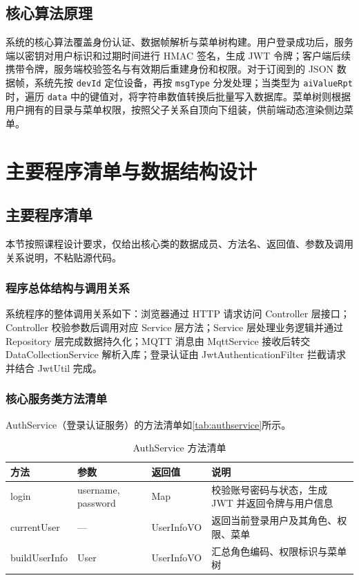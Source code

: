 \documentclass[12pt,hyperref,a4paper,UTF8]{ctexart}
\begin{document}
\subsection{核心算法原理}

系统的核心算法覆盖身份认证、数据帧解析与菜单树构建。用户登录成功后，服务端以密钥对用户标识和过期时间进行 HMAC 签名，生成 JWT 令牌；客户端后续携带令牌，服务端校验签名与有效期后重建身份和权限。对于订阅到的 JSON 数据帧，系统先按 \texttt{devId} 定位设备，再按 \texttt{msgType} 分发处理；当类型为 \texttt{aiValueRpt} 时，遍历 \texttt{data} 中的键值对，将字符串数值转换后批量写入数据库。菜单树则根据用户拥有的目录与菜单权限，按照父子关系自顶向下组装，供前端动态渲染侧边菜单。

\section{主要程序清单与数据结构设计}

\subsection{主要程序清单}

本节按照课程设计要求，仅给出核心类的数据成员、方法名、返回值、参数及调用关系说明，不粘贴源代码。

\subsubsection{程序总体结构与调用关系}

系统程序的整体调用关系如下：浏览器通过 HTTP 请求访问 Controller 层接口；Controller 校验参数后调用对应 Service 层方法；Service 层处理业务逻辑并通过 Repository 层完成数据持久化；MQTT 消息由 MqttService 接收后转交 DataCollectionService 解析入库；登录认证由 JwtAuthenticationFilter 拦截请求并结合 JwtUtil 完成。

\subsubsection{核心服务类方法清单}

AuthService（登录认证服务）的方法清单如\autoref{tab:authservice}所示。

\begin{table}[!htbp]
    \centering
    \caption{AuthService 方法清单}
    \label{tab:authservice}
    \begin{tabularx}{0.90\textwidth}{@{}L{3.2cm} L{3.4cm} L{2.3cm} Y@{}}
    \toprule
    \textbf{方法} & \textbf{参数} & \textbf{返回值} & \textbf{说明} \\
    \midrule
    login & username, password & Map & 校验账号密码与状态，生成 JWT 并返回令牌与用户信息 \\
    currentUser & — & UserInfoVO & 返回当前登录用户及其角色、权限、菜单 \\
    buildUserInfo & User & UserInfoVO & 汇总角色编码、权限标识与菜单树 \\
    \bottomrule
    \end{tabularx}
\end{table}
\end{document}
